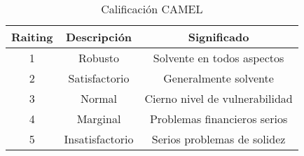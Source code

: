 \begin{table}[tbp]

\centering
\caption{Calificación CAMEL}

\begin{tabular}{|c|c|c|}
\hline
\textbf{Raiting} & \textbf{Descripción} & \textbf{Significado}            \\ \hline
1                & Robusto              & Solvente en todos aspectos      \\ \hline
2                & Satisfactorio        & Generalmente solvente           \\ \hline
3                & Normal               & Cierno nivel de vulnerabilidad  \\ \hline
4                & Marginal             & Problemas financieros serios    \\ \hline
5                & Insatisfactorio      & Serios problemas de solidez \\ \hline
\end{tabular}
\end{table}